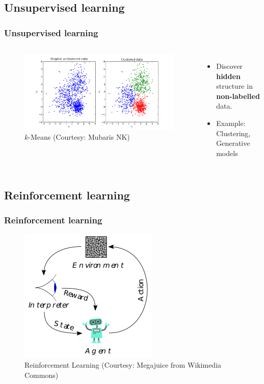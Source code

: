\documentclass[aspectratio=169]{beamer}
\begin{document}
\subsection{Unsupervised learning}

\begin{frame}
	\frametitle{Unsupervised learning}
	\begin{columns}
		\begin{figure}
			\includegraphics[width=1.0\textwidth]{imgs/kmeans.png}
			\caption{$k$-Means (Courtesy: Mubaris NK)}
		\end{figure}
		\begin{itemize}
			\item<2-> Discover \textbf{hidden} structure in \textbf{non-labelled} data.
			\item<3-> Example: Clustering, Generative models
		\end{itemize}
	\end{columns}
\end{frame}

\subsection{Reinforcement learning}

\begin{frame}
	\frametitle{Reinforcement learning}
	\begin{figure}
		\includegraphics[scale=.7]{imgs/reinforcement_learning.png}
		\caption{Reinforcement Learning (Courtesy: Megajuice from Wikimedia Commons)}
	\end{figure}
\end{frame}
\end{document}
